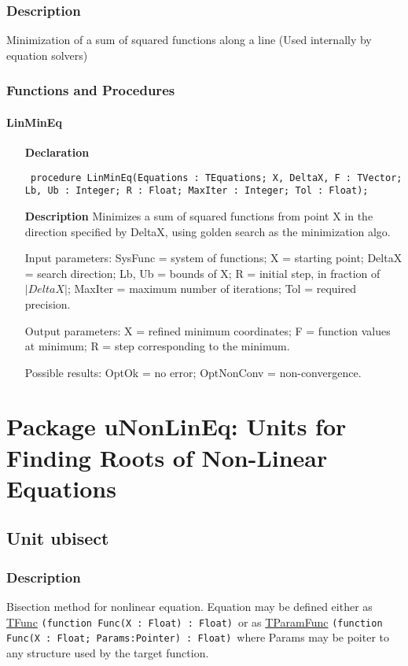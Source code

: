 \documentclass[12pt,a4paper,oneside]{report}
\newcommand{\declarationitem}[1]{\textbf{#1}}
\newcommand{\descriptiontitle}[1]{\textbf{#1}}
\newcommand{\code}[1]{\texttt{#1}}
\begin{document}
\subsection{Description}
Minimization of a sum of squared functions along a line (Used internally by equation solvers) 
\subsection{Functions and Procedures}
\subsubsection{LinMinEq}
\label{ulinminq-LinMinEq}
\begin{itemize}\item[\declarationitem{Declaration}\hfill]
	\begin{flushleft}
		\code{
			procedure LinMinEq(Equations : TEquations; X, DeltaX, F : TVector; Lb, Ub : Integer; R : Float; MaxIter : Integer; Tol : Float);}
		
	\end{flushleft}
	
	\par
	\item[\descriptiontitle{Description}]
	Minimizes a sum of squared functions from point X in the direction specified by DeltaX, using golden search as the minimization algo.
	
	Input parameters: SysFunc = system of functions; X = starting point; DeltaX = search direction; Lb, Ub = bounds of X; R = initial step, in fraction of $|DeltaX|$; MaxIter = maximum number of iterations; Tol = required precision.
	
	Output parameters: X = refined minimum coordinates; F = function values at minimum; R = step corresponding to the minimum.
	
	Possible results: OptOk = no error; OptNonConv = non{-}convergence.
	
\end{itemize}
\chapter{Package uNonLinEq: Units for Finding Roots of Non-Linear Equations}\label{package-unonlineq}
\section{Unit ubisect}
\label{ubisect}
\subsection{Description}
Bisection method for nonlinear equation. Equation may be defined either as \hyperref[utypes-TFunc]{TFunc} \code{(function Func(X : Float) : Float)}\ or as \hyperref[utypes-TParamFunc]{TParamFunc} \code{(function Func(X : Float; Params:Pointer) : Float)}\ where Params may be poiter to any structure used by the target function.  
\end{document}
